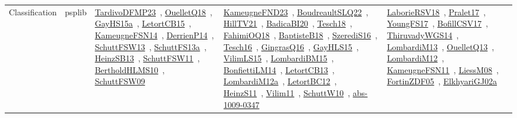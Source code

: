 {\begin{longtable}{lp{3cm}>{\raggedright\arraybackslash}p{6cm}>{\raggedright\arraybackslash}p{6cm}>{\raggedright\arraybackslash}p{8cm}}
Classification & psplib & \href{works/TardivoDFMP23.pdf}{TardivoDFMP23}~\cite{TardivoDFMP23}, \href{works/OuelletQ18.pdf}{OuelletQ18}~\cite{OuelletQ18}, \href{works/GayHS15a.pdf}{GayHS15a}~\cite{GayHS15a}, \href{works/LetortCB15.pdf}{LetortCB15}~\cite{LetortCB15}, \href{works/KameugneFSN14.pdf}{KameugneFSN14}~\cite{KameugneFSN14}, \href{works/DerrienP14.pdf}{DerrienP14}~\cite{DerrienP14}, \href{works/SchuttFSW13.pdf}{SchuttFSW13}~\cite{SchuttFSW13}, \href{works/SchuttFS13a.pdf}{SchuttFS13a}~\cite{SchuttFS13a}, \href{works/HeinzSB13.pdf}{HeinzSB13}~\cite{HeinzSB13}, \href{works/SchuttFSW11.pdf}{SchuttFSW11}~\cite{SchuttFSW11}, \href{works/BertholdHLMS10.pdf}{BertholdHLMS10}~\cite{BertholdHLMS10}, \href{works/SchuttFSW09.pdf}{SchuttFSW09}~\cite{SchuttFSW09} & \href{works/KameugneFND23.pdf}{KameugneFND23}~\cite{KameugneFND23}, \href{works/BoudreaultSLQ22.pdf}{BoudreaultSLQ22}~\cite{BoudreaultSLQ22}, \href{works/HillTV21.pdf}{HillTV21}~\cite{HillTV21}, \href{works/BadicaBI20.pdf}{BadicaBI20}~\cite{BadicaBI20}, \href{works/Tesch18.pdf}{Tesch18}~\cite{Tesch18}, \href{works/FahimiOQ18.pdf}{FahimiOQ18}~\cite{FahimiOQ18}, \href{works/BaptisteB18.pdf}{BaptisteB18}~\cite{BaptisteB18}, \href{works/SzerediS16.pdf}{SzerediS16}~\cite{SzerediS16}, \href{works/Tesch16.pdf}{Tesch16}~\cite{Tesch16}, \href{works/GingrasQ16.pdf}{GingrasQ16}~\cite{GingrasQ16}, \href{works/GayHLS15.pdf}{GayHLS15}~\cite{GayHLS15}, \href{works/VilimLS15.pdf}{VilimLS15}~\cite{VilimLS15}, \href{works/LombardiBM15.pdf}{LombardiBM15}~\cite{LombardiBM15}, \href{works/BonfiettiLM14.pdf}{BonfiettiLM14}~\cite{BonfiettiLM14}, \href{works/LetortCB13.pdf}{LetortCB13}~\cite{LetortCB13}, \href{works/LombardiM12a.pdf}{LombardiM12a}~\cite{LombardiM12a}, \href{works/LetortBC12.pdf}{LetortBC12}~\cite{LetortBC12}, \href{works/HeinzS11.pdf}{HeinzS11}~\cite{HeinzS11}, \href{works/Vilim11.pdf}{Vilim11}~\cite{Vilim11}, \href{works/SchuttW10.pdf}{SchuttW10}~\cite{SchuttW10}, \href{works/abs-1009-0347.pdf}{abs-1009-0347}~\cite{abs-1009-0347} & \href{works/LaborieRSV18.pdf}{LaborieRSV18}~\cite{LaborieRSV18}, \href{works/Pralet17.pdf}{Pralet17}~\cite{Pralet17}, \href{works/YoungFS17.pdf}{YoungFS17}~\cite{YoungFS17}, \href{works/BofillCSV17.pdf}{BofillCSV17}~\cite{BofillCSV17}, \href{works/ThiruvadyWGS14.pdf}{ThiruvadyWGS14}~\cite{ThiruvadyWGS14}, \href{works/LombardiM13.pdf}{LombardiM13}~\cite{LombardiM13}, \href{works/OuelletQ13.pdf}{OuelletQ13}~\cite{OuelletQ13}, \href{works/LombardiM12.pdf}{LombardiM12}~\cite{LombardiM12}, \href{works/KameugneFSN11.pdf}{KameugneFSN11}~\cite{KameugneFSN11}, \href{works/LiessM08.pdf}{LiessM08}~\cite{LiessM08}, \href{works/FortinZDF05.pdf}{FortinZDF05}~\cite{FortinZDF05}, \href{works/ElkhyariGJ02a.pdf}{ElkhyariGJ02a}~\cite{ElkhyariGJ02a}\\

\end{longtable}}
